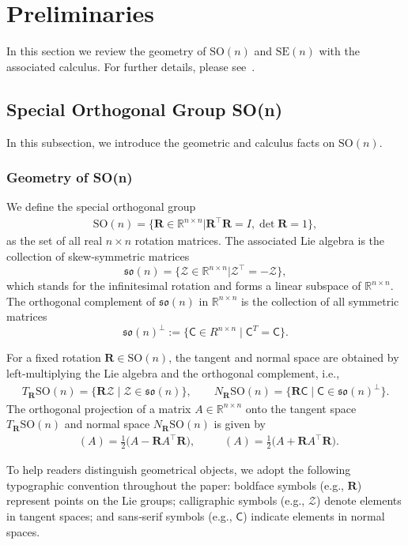 \documentclass[11pt, a4paper, onecolumn]{article}
\newcommand{\SOn}{\mathrm{SO}(n)}
\newcommand{\son}{\mathfrak{so}(n)}
\newcommand{\sonp}{\mathfrak{so}(n)^{\perp}}
\newcommand{\SEn}{\mathrm{SE}(n)}
\newcommand{\nmC}{\mathsf{C}}
\renewcommand{\bf}[1]{\mathbf{#1}}
\newcommand{\tg}[1]{\mathcal{#1}}
\newcommand{\nm}[1]{\mathsf{#1}}
\newcommand{\half}{{\frac{1}{2}}}
\DeclareMathOperator{\POtg}{\Pi^O_{T_{\bf R}}}
\DeclareMathOperator{\POnm}{\Pi^O_{N_{\bf R}}}
\begin{document}
\section{Preliminaries}\label{sec:prelim}
In this section we review the geometry of $\SOn$ and $\SEn$ with the associated calculus. For further details, please see~\cite{gallier2020differential,lee2018introduction}.
\subsection{Special Orthogonal Group SO(n)}
In this subsection, we introduce the geometric and calculus facts on $\SOn$.
\subsubsection{Geometry of SO(n)}
We define the special orthogonal group
\begin{align*}
   \SOn = \bigl\{\bf R\in\mathbb R^{n\times n} \bigl| \bf R^{\top}\mathbf R = I,  \det\bf R = 1\bigr\}, 
\end{align*}
as the set of all real $n\times n$ rotation matrices. The associated Lie algebra is the collection of skew‑symmetric matrices $$\son = \bigl\{\tg Z\in\mathbb R^{n\times n} \bigl| \tg Z^{\top}=-\tg Z\bigr\},$$
which stands for the infinitesimal rotation and forms a linear subspace of $\mathbb R^{n\times n}$. The orthogonal complement of $\son$ in $\mathbb R^{n\times n}$ is the collection of all symmetric matrices $$\sonp:=\{\nmC \in R^{n\times n} \mid \nmC^T = \nmC\}.$$

For a fixed rotation $\bf R\in\SOn$, the tangent and normal space are obtained by left‑multiplying the Lie algebra and the orthogonal complement, i.e., 
\begin{align*}
    T_{\bf R}\SOn = \{\bf R\tg Z \mid \tg Z\in\son\}, \qquad
    N_{\bf R}\SOn = \{\mathbf R \nm C \mid \nm C \in \sonp \}.
\end{align*}
 The orthogonal projection of a matrix $A \in \mathbb{R}^{n \times n}$ onto the tangent space $T_{\bf R}\SOn$ and normal space $N_{\bf R}\SOn$ is given by
\begin{align*}
\POtg(A) = \half\bigl(A-\bf R A^{\top}\bf R\bigr), \qquad
\POnm (A) = \half\bigl(A + \bf R A^{\top}\bf R\bigr).
\end{align*}

To help readers distinguish geometrical objects, we adopt the following typographic convention throughout the paper: boldface symbols (e.g., $\mathbf R$) represent points on the Lie groups; calligraphic symbols (e.g., $\mathcal Z$) denote elements in tangent spaces; and sans‑serif symbols (e.g., $\mathsf C$) indicate elements in normal spaces.
\end{document}
